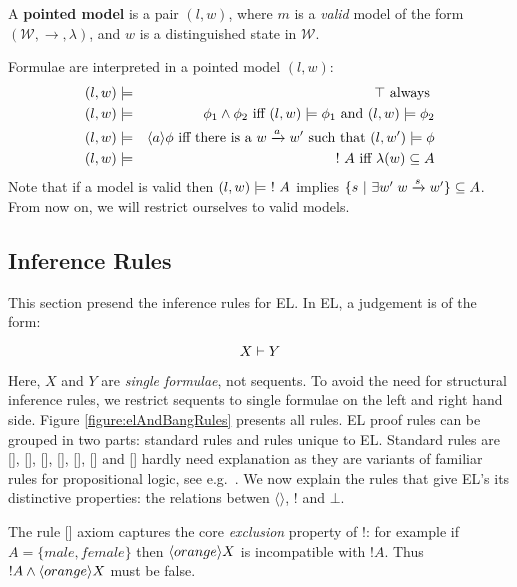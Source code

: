 \begin{definition}
A {\bf pointed model} is a pair $(l,w)$, where $m$ is a \emph{valid} model of the form $(\mathcal{W}, \rightarrow, \lambda)$, and $w$ is a distinguished state in $\mathcal{W}$.
\end{definition}
Formulae are interpreted in a pointed model $(l,w)$:
\begin{eqnarray}
(l,w) & \models & \top  \mbox{ always } \nonumber \\
(l,w) & \models & \phi_1 \land \phi_2 \mbox{ iff } (l,w)  \models \phi_1 \mbox { and } (l,w) \models \phi_2 \nonumber \\
(l,w) & \models & \langle a \rangle \phi \mbox{ iff there is a } w \xrightarrow{a} w' \mbox { such that } (l,w') \models \phi \nonumber \\
(l,w) & \models & \ ! \  A \mbox{ iff } \lambda(w) \subseteq A\nonumber
\end{eqnarray}
Note that if a model is valid then $(l,w) \models \ ! \  A$ implies $\{s \ | \  \exists w' \; w \xrightarrow{s} w'\} \subseteq A$.
From now on, we will restrict ourselves to valid models.






\subsection{Inference Rules}

This section presend the inference rules for EL.
In EL, a judgement is of the form:

\[
  X \vdash Y
\]

\NI Here, $X$ and $Y$ are \emph{single formulae}, not sequents.  To
avoid the need for structural inference rules, we restrict sequents to
single formulae on the left and right hand side. Figure
\ref{figure:elAndBangRules} presents all rules.  EL proof rules can be
grouped in two parts: standard rules and rules unique to EL.  Standard
rules are [], [],
[], [],
[], [] and
[] hardly need explanation as they are variants
of familiar rules for propositional logic, see
e.g.~\cite{TroelstraAS:basprot,vanDalenD:logstr}.  We now explain the
rules that give EL's its distinctive properties: the relations betwen
$\langle \rangle$, $!$ and $\bot$.

The rule [] axiom captures the core
\emph{exclusion} property of !: for example if $A = \{male, female\}$
then $\langle orange \rangle X$ is incompatible with $!A$. Thus $!A \land
\langle orange \rangle X$ must be false.


